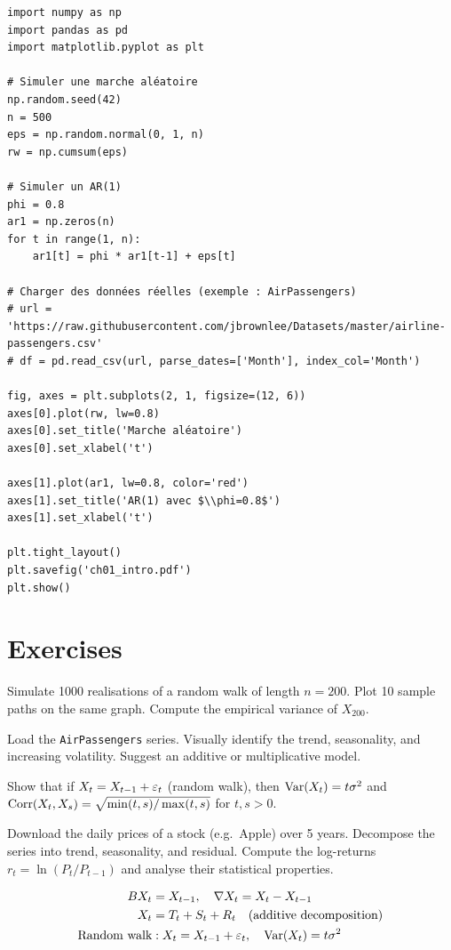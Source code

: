 \begin{codeblock}[title=\textbf{Python}]
\begin{verbatim}
import numpy as np
import pandas as pd
import matplotlib.pyplot as plt

# Simuler une marche aléatoire
np.random.seed(42)
n = 500
eps = np.random.normal(0, 1, n)
rw = np.cumsum(eps)

# Simuler un AR(1)
phi = 0.8
ar1 = np.zeros(n)
for t in range(1, n):
    ar1[t] = phi * ar1[t-1] + eps[t]

# Charger des données réelles (exemple : AirPassengers)
# url = 'https://raw.githubusercontent.com/jbrownlee/Datasets/master/airline-passengers.csv'
# df = pd.read_csv(url, parse_dates=['Month'], index_col='Month')

fig, axes = plt.subplots(2, 1, figsize=(12, 6))
axes[0].plot(rw, lw=0.8)
axes[0].set_title('Marche aléatoire')
axes[0].set_xlabel('t')

axes[1].plot(ar1, lw=0.8, color='red')
axes[1].set_title('AR(1) avec $\\phi=0.8$')
axes[1].set_xlabel('t')

plt.tight_layout()
plt.savefig('ch01_intro.pdf')
plt.show()
\end{verbatim}
\end{codeblock}

\section{Exercises}

\begin{exercise}[$\star$]
Simulate 1000 realisations of a random walk of length $n=200$. Plot 10 sample paths on the same graph. Compute the empirical variance of $X_{200}$.
\end{exercise}

\begin{exercise}[$\star$]
Load the \texttt{AirPassengers} series. Visually identify the trend, seasonality, and increasing volatility. Suggest an additive or multiplicative model.
\end{exercise}

\begin{exercise}[$\star\star$]
Show that if $X_t = X_{t-1}+\varepsilon_t$ (random walk), then $\operatorname{Var}(X_t)=t\sigma^2$ and $\operatorname{Corr}(X_t,X_s)=\sqrt{\min(t,s)/\max(t,s)}$ for $t,s>0$.
\end{exercise}

\begin{exercise}
Download the daily prices of a stock (e.g.\ Apple) over 5 years. Decompose the series into trend, seasonality, and residual. Compute the log-returns $r_t=\ln(P_t/P_{t-1})$ and analyse their statistical properties.
\end{exercise}

\begin{keyformulas}
\begin{align*}
BX_t &= X_{t-1}, \quad \nabla X_t = X_t - X_{t-1} \\
X_t &= T_t + S_t + R_t \quad \text{(additive decomposition)} \\
\text{Random walk} &: X_t = X_{t-1}+\varepsilon_t, \quad \operatorname{Var}(X_t)=t\sigma^2
\end{align*}
\end{keyformulas}
